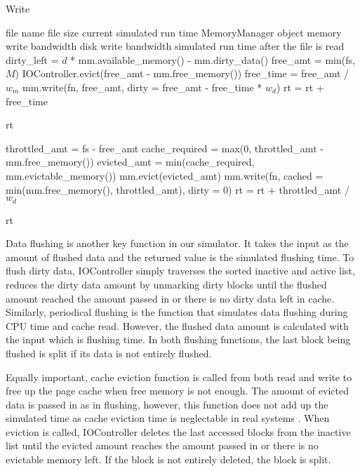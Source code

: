 \documentclass[conference]{IEEEtran}
\newcommand{\Desc}[2]{\State \makebox[2em][l]{#1}#2}
\begin{document}
			\begin{algorithm}\caption{Write}\label{alg:write}
				\small
				\begin{algorithmic}[1]
					\Input
        				\Desc{fn}{file name}
        				\Desc{fs}{file size}
						\Desc{rt}{current simulated run time}
						\Desc{mm}{MemoryManager object}
						\Desc{$w_m$}{memory write bandwidth}
						\Desc{$w_d$}{disk write bandwidth}
   					\EndInput
   					\Output
						\Desc{rt}{simulated run time after the file is read}
   					\EndOutput
					\State dirty\_left = $d$ * mm.available\_memory() - mm.dirty\_data()
   						\State free\_amt = min(fs, $M$) 
    					\State IOController.evict(free\_amt - mm.free\_memory())
    					\State free\_time = free\_amt / $w_m$
    					\State mm.write(fn, free\_amt, dirty = free\_amt - free\_time * $w_d$)
   						\State rt = rt + free\_time
    				\EndIf
					
						\Return rt
					\EndIf

					\State throttled\_amt = fs - free\_amt
					\State cache\_required = max(0, throttled\_amt  - mm.free\_memory())
					\State evicted\_amt = min(cache\_required, mm.evictable\_memory())
					\State mm.evict(evicted\_amt)
					\State mm.write(fn, cached = min(mm.free\_memory(), 
					throttled\_amt), dirty = 0)
					\State rt = rt + throttled\_amt /$w_d$

					\Return rt
					
				\end{algorithmic}
			\end{algorithm}	
			
			Data flushing is another key function in our simulator. It takes 
			the input as the amount of flushed data and the returned value is the 
			simulated flushing time. To flush dirty data, IOController simply 
			traverses the sorted inactive and active list, reduces the dirty data 
			amount by unmarking dirty blocks until the flushed amount reached 
			the amount passed in or there is no dirty data left in cache. 
			Similarly, periodical flushing is the function that simulates data flushing 
			during CPU time and cache read. However, the flushed data amount is 
			calculated with the input which is flushing time. In both flushing 
			functions, the last block being flushed is split if its data is not 
			entirely flushed.			
				
			Equally important, cache eviction function is called from both 
			read and write to free up the page cache when free memory 
			is not enough. The amount of evicted data is passed in as in flushing, 
			however, this function does not add up the simulated time as 
			cache eviction time is neglectable in real systems . When eviction 
			is called, IOController deletes the last accessed blocks from the 
			inactive list until the evicted amount reaches the amount passed in or 
			there is no evictable memory left. If the block is not entirely deleted, 
			the block is split.
			
\end{document}
